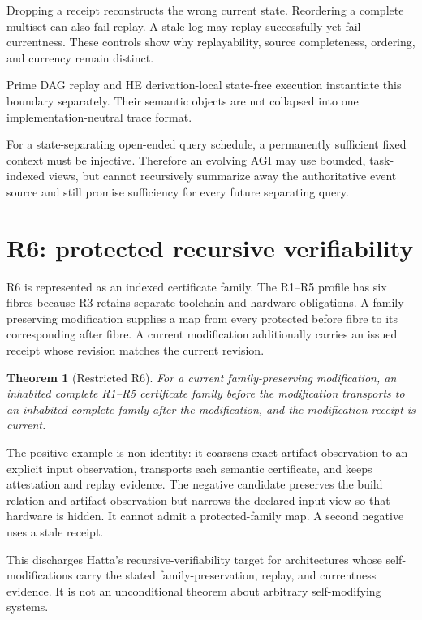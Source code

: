 \documentclass[11pt]{article}
\newtheorem{theorem}[definition]{Theorem}
\begin{document}
Dropping a receipt reconstructs the wrong current state.  Reordering a complete
multiset can also fail replay.  A stale log may replay successfully yet fail
currentness.  These controls show why replayability, source completeness,
ordering, and currency remain distinct.

Prime DAG replay and HE derivation-local state-free execution instantiate this
boundary separately.  Their semantic objects are not collapsed into one
implementation-neutral trace format.

For a state-separating open-ended query schedule, a permanently sufficient
fixed context must be injective.  Therefore an evolving AGI may use bounded,
task-indexed views, but cannot recursively summarize away the authoritative
event source and still promise sufficiency for every future separating query.

\section{R6: protected recursive verifiability}

R6 is represented as an indexed certificate family.  The R1--R5 profile has
six fibres because R3 retains separate toolchain and hardware obligations.
A family-preserving modification supplies a map from every protected before
fibre to its corresponding after fibre.  A current modification additionally
carries an issued receipt whose revision matches the current revision.

\begin{theorem}[Restricted R6]
For a current family-preserving modification, an inhabited complete R1--R5
certificate family before the modification transports to an inhabited
complete family after the modification, and the modification receipt is
current.
\end{theorem}

The positive example is non-identity: it coarsens exact artifact observation to
an explicit input observation, transports each semantic certificate, and keeps
attestation and replay evidence.  The negative candidate preserves the build
relation and artifact observation but narrows the declared input view so that
hardware is hidden.  It cannot admit a protected-family map.  A second negative
uses a stale receipt.

This discharges Hatta's recursive-verifiability target for architectures whose
self-modifications carry the stated family-preservation, replay, and
currentness evidence.  It is not an unconditional theorem about arbitrary
self-modifying systems.
\end{document}

